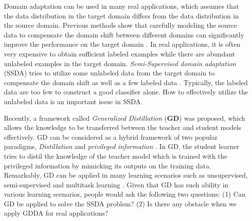 
Domain adaptation can be used in many real applications, which assumes that the data distribution in the target domain differs from the data distribution in the source domain. Previous methods show that carefully modeling the source data to compensate the domain shift between different domains can significantly improve the performance on the target domain \cite{Donahue_2013_CVPR}. In real applications, it is often very expensive to obtain sufficient labeled examples while there are abundant unlabeled examples in the target domain. 
\textit{Semi-Supervised domain adaptation} (SSDA) tries to utilize some unlabeled data from the target domain to compensate the domain shift as well as a few labeled data \cite{karl2001long}. Typically, the labeled data are too few to  construct a good classifier alone. How to effectively utilize the unlabeled data is an important issue in SSDA. 

Recently, a framework called \textit{Generalized Distillation} (\textbf{GD}) \cite{lopez2015unifying} was proposed, which allows the knowledge to be transferred between the teacher and student models effectively. GD can be considered as a hybrid framework of two popular paradigms, \textit{Distillation} \cite{hinton2015distilling} and \textit{privileged information} \cite{vapnik2015learning}. In GD, the student learner tries to distil the knowledge of the teacher model which is trained with the privileged information by  mimicking its outputs on the training data. Remarkably, GD can be applied in many learning scenarios such as unsupervised, semi-supervised and multitask learning \cite{lopez2015unifying}. Given that GD has such ability in various learning scenarios, people would ask the following two questions: (1) Can GD be applied to solve the SSDA problem? (2) Is there any obstacle when we apply GDDA for real applications?

